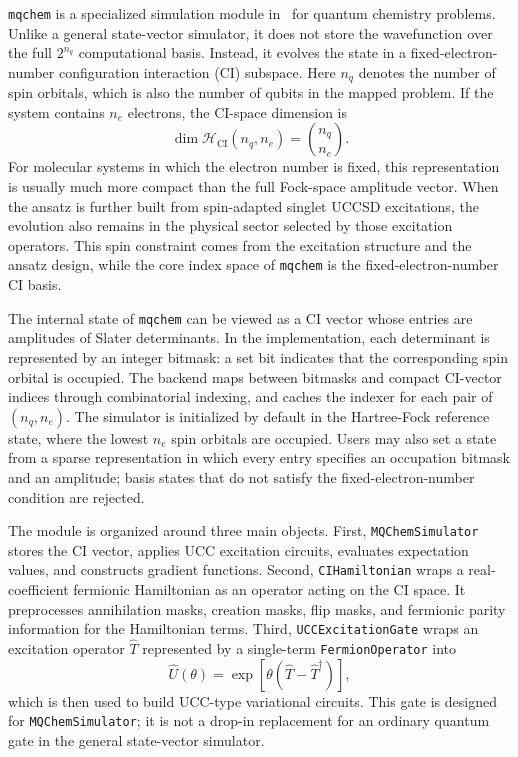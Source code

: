 \texttt{mqchem} is a specialized simulation module in \MindQuantum\ for quantum chemistry problems. Unlike a general state-vector simulator, it does not store the wavefunction over the full $2^{n_q}$ computational basis. Instead, it evolves the state in a fixed-electron-number configuration interaction (CI) subspace. Here $n_q$ denotes the number of spin orbitals, which is also the number of qubits in the mapped problem. If the system contains $n_e$ electrons, the CI-space dimension is
\begin{equation}
    \dim \mathcal{H}_{\mathrm{CI}}(n_q,n_e)=\binom{n_q}{n_e}.
\end{equation}
For molecular systems in which the electron number is fixed, this representation is usually much more compact than the full Fock-space amplitude vector. When the ansatz is further built from spin-adapted singlet UCCSD excitations, the evolution also remains in the physical sector selected by those excitation operators. This spin constraint comes from the excitation structure and the ansatz design, while the core index space of \texttt{mqchem} is the fixed-electron-number CI basis.

The internal state of \texttt{mqchem} can be viewed as a CI vector whose entries are amplitudes of Slater determinants. In the implementation, each determinant is represented by an integer bitmask: a set bit indicates that the corresponding spin orbital is occupied. The backend maps between bitmasks and compact CI-vector indices through combinatorial indexing, and caches the indexer for each pair of $(n_q,n_e)$. The simulator is initialized by default in the Hartree-Fock reference state, where the lowest $n_e$ spin orbitals are occupied. Users may also set a state from a sparse representation in which every entry specifies an occupation bitmask and an amplitude; basis states that do not satisfy the fixed-electron-number condition are rejected.

The module is organized around three main objects. First, \texttt{MQChemSimulator} stores the CI vector, applies UCC excitation circuits, evaluates expectation values, and constructs gradient functions. Second, \texttt{CIHamiltonian} wraps a real-coefficient fermionic Hamiltonian as an operator acting on the CI space. It preprocesses annihilation masks, creation masks, flip masks, and fermionic parity information for the Hamiltonian terms. Third, \texttt{UCCExcitationGate} wraps an excitation operator $\hat{T}$ represented by a single-term \texttt{FermionOperator} into
\begin{equation}
    \hat{U}(\theta)=\exp\left[\theta\left(\hat{T}-\hat{T}^{\dagger}\right)\right],
\end{equation}
which is then used to build UCC-type variational circuits. This gate is designed for \texttt{MQChemSimulator}; it is not a drop-in replacement for an ordinary quantum gate in the general state-vector simulator.

